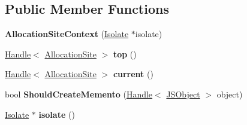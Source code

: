 \subsection*{Public Member Functions}
\begin{DoxyCompactItemize}
\item 
{\bfseries Allocation\+Site\+Context} (\hyperlink{classv8_1_1internal_1_1_isolate}{Isolate} $\ast$isolate)\hypertarget{classv8_1_1internal_1_1_allocation_site_context_acad3aa6b62e34d542b6fd6c9b87e2093}{}\label{classv8_1_1internal_1_1_allocation_site_context_acad3aa6b62e34d542b6fd6c9b87e2093}

\item 
\hyperlink{classv8_1_1internal_1_1_handle}{Handle}$<$ \hyperlink{classv8_1_1internal_1_1_allocation_site}{Allocation\+Site} $>$ {\bfseries top} ()\hypertarget{classv8_1_1internal_1_1_allocation_site_context_a76427a09d8c0eef6794ecfd804ca8eea}{}\label{classv8_1_1internal_1_1_allocation_site_context_a76427a09d8c0eef6794ecfd804ca8eea}

\item 
\hyperlink{classv8_1_1internal_1_1_handle}{Handle}$<$ \hyperlink{classv8_1_1internal_1_1_allocation_site}{Allocation\+Site} $>$ {\bfseries current} ()\hypertarget{classv8_1_1internal_1_1_allocation_site_context_a20943342b9c850bc0f1c3fd0aef56e9a}{}\label{classv8_1_1internal_1_1_allocation_site_context_a20943342b9c850bc0f1c3fd0aef56e9a}

\item 
bool {\bfseries Should\+Create\+Memento} (\hyperlink{classv8_1_1internal_1_1_handle}{Handle}$<$ \hyperlink{classv8_1_1internal_1_1_j_s_object}{J\+S\+Object} $>$ object)\hypertarget{classv8_1_1internal_1_1_allocation_site_context_adfa2a2817414d94fd00728a2c163d7b0}{}\label{classv8_1_1internal_1_1_allocation_site_context_adfa2a2817414d94fd00728a2c163d7b0}

\item 
\hyperlink{classv8_1_1internal_1_1_isolate}{Isolate} $\ast$ {\bfseries isolate} ()\hypertarget{classv8_1_1internal_1_1_allocation_site_context_a8adcb0b60cf5fbda807b0a11c128ab4a}{}\label{classv8_1_1internal_1_1_allocation_site_context_a8adcb0b60cf5fbda807b0a11c128ab4a}

\end{DoxyCompactItemize}
